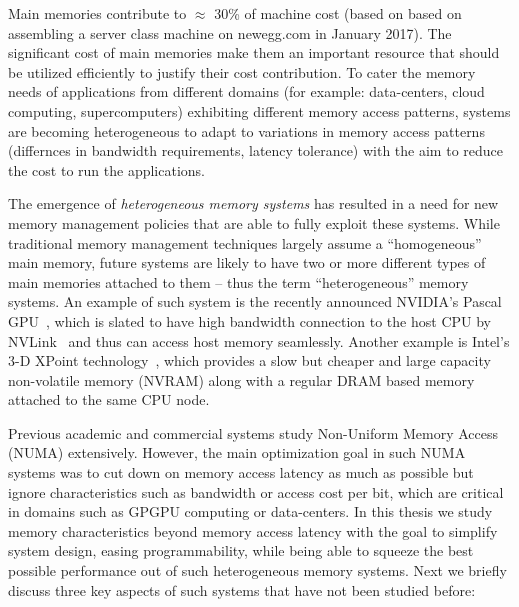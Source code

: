 %
%

Main memories contribute to $\approx$ 30\% of machine cost (based on based
on assembling a server class machine on newegg.com in January 2017). The
significant cost of main memories make them an important resource that should be
utilized efficiently to justify their cost contribution. To cater
the memory needs of applications from different domains (for example:
data-centers, cloud computing, supercomputers) exhibiting different memory
access patterns, systems are becoming heterogeneous to adapt to variations in
memory access patterns (differnces in bandwidth requirements, latency tolerance)
with the aim to reduce the cost to run the applications.

The emergence of {\it heterogeneous memory systems} has resulted in a need for
new memory management policies that are able to fully exploit these systems.
While traditional memory management techniques largely assume a ``homogeneous''
main memory, future systems are likely to have two or more different types of
main memories attached to them -- thus the term ``heterogeneous'' memory
systems. An example of such system is the recently announced NVIDIA's Pascal
GPU~\cite{pascal}, which is slated to have high bandwidth connection to the host
CPU by NVLink~\cite{NVLINK} and thus can access host memory seamlessly.  Another
example is Intel's 3-D XPoint technology~\cite{xpoint}, which provides a slow
but cheaper and large capacity non-volatile memory (NVRAM) along with a regular
DRAM based memory attached to the same CPU node.

Previous academic and commercial systems study Non-Uniform Memory Access (NUMA)
extensively. However, the main optimization goal in such NUMA systems was to cut
down on memory access latency as much as possible but ignore characteristics
such as bandwidth or access cost per bit, which are critical in
domains such as GPGPU computing or data-centers. In this thesis we study memory
characteristics beyond memory access latency with the goal to simplify system
design, easing programmability, while being able to squeeze the best possible
performance out of such heterogeneous memory systems. Next we briefly discuss
three key aspects of such systems that have not been studied before:

